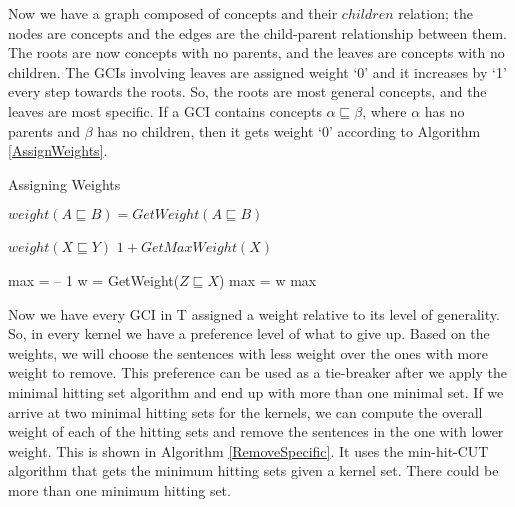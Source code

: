 Now we have a graph composed of concepts and their $children$ relation; the nodes are concepts and the edges are the child-parent relationship between them. The roots are now concepts with no parents, and the leaves are concepts with no children. The GCIs involving leaves are assigned weight `0' and it increases by `1' every step towards the roots. So, the roots are most general concepts, and the leaves are most specific. If a GCI contains concepts $\alpha \sqsubseteq \beta$, where $\alpha$ has no parents and $\beta$ has no children, then it gets weight `0' according to Algorithm \ref{AssignWeights}.

\begin{algorithm}
\caption{Assigning Weights}
\label{AssignWeights}
\begin{algorithmic}[1]
\State $weight(A \sqsubseteq B) = GetWeight(A \sqsubseteq B)$
\EndFor
\EndFunction
\end{algorithmic}

\begin{algorithmic}[1]
\State
\Return $weight(X \sqsubseteq Y)$
\EndIf
{}
\State
{}
\Else
\State
\Return $1 + GetMaxWeight(X)$
\EndIf
\EndFunction
\end{algorithmic}

\begin{algorithmic}[1]
\State max = -- 1
\State w = GetWeight($Z \sqsubseteq X$)
\State max = w
\EndIf
\EndFor
\State
\Return max
\EndFunction
\end{algorithmic}
\end{algorithm}

Now we have every GCI in T assigned a weight relative to its level of generality. So, in every kernel we have a preference level of what to give up. Based on the weights, we will choose the sentences with less weight over the ones with more weight to remove. This preference can be used as a tie-breaker after we apply the minimal hitting set algorithm and end up with more than one minimal set. If we arrive at two minimal hitting sets for the kernels, we can compute the overall weight of each of the hitting sets and remove the sentences in the one with lower weight. This is shown in Algorithm \ref{RemoveSpecific}. It uses the min-hit-CUT algorithm that gets the minimum hitting sets given a kernel set. There could be more than one minimum hitting set.

